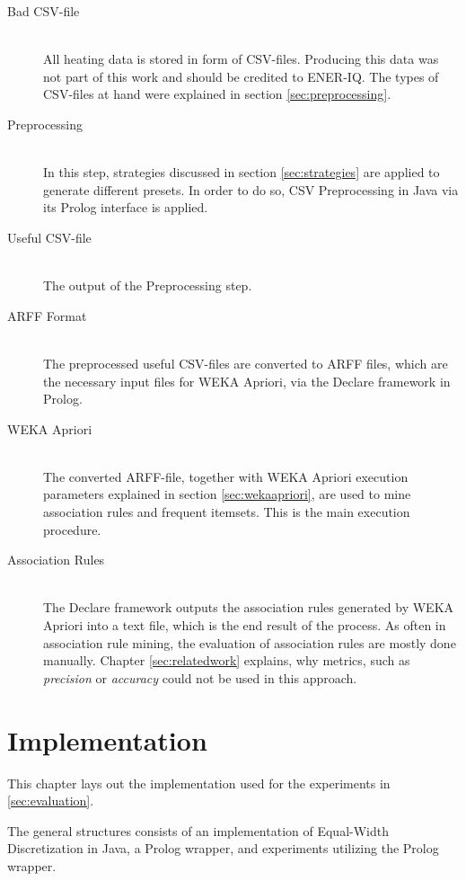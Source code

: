 \documentclass[bachelor,english]{info1thesis}
\begin{document}
\begin{description}
	\item[Bad CSV-file]\hfill \\
	All heating data is stored in form of CSV-files. Producing this data was not part of this work and should be credited to ENER-IQ. The types of CSV-files at hand were explained in section \ref{sec:preprocessing}.
	\item[Preprocessing]\hfill \\ 
	In this step, strategies discussed in section \ref{sec:strategies} are applied to generate different presets. In order to do so, CSV Preprocessing in Java via its Prolog interface is applied.
	\item[Useful CSV-file]\hfill \\ 
	The output of the Preprocessing step.
	\item[ARFF Format]\hfill \\ 
	The preprocessed useful CSV-files are converted to ARFF files, which are the necessary input files for WEKA Apriori, via the Declare framework in Prolog.	
	\item[WEKA Apriori]\hfill \\ 
	The converted ARFF-file, together with WEKA Apriori execution parameters explained in section \ref{sec:wekaapriori}, are used to mine association rules and frequent itemsets. This is the main execution procedure.
	\item[Association Rules]\hfill \\ 
	The Declare framework outputs the association rules generated by WEKA Apriori into a text file, which is the end result of the process. As often in association rule mining, the evaluation of association rules are mostly done manually. Chapter \ref{sec:relatedwork} explains, why metrics, such as \textit{precision} or \textit{accuracy} could not be used in this approach.
	
\end{description}



\chapter{Implementation}
\label{sec:implementation}

This chapter lays out the implementation used for the experiments in \ref{sec:evaluation}.

The general structures consists of an implementation of Equal-Width Discretization in Java, a Prolog wrapper, and experiments utilizing the Prolog wrapper.
\end{document}

